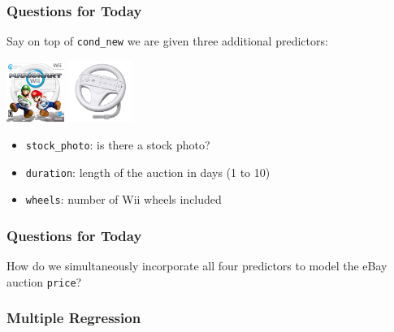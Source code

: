 \documentclass[handout]{beamer}
\newcommand{\blue}[1]{\textcolor{blue2}{#1}}
\begin{document}
\begin{frame}[fragile]
\frametitle{Questions for Today}


Say on top of {\tt cond\_new} we are given three additional predictors:
\pause\begin{center}
\includegraphics[height=2cm]{figure/mario_kart_action.png}
\includegraphics[height=2cm]{figure/wheel.png}
\end{center}

\begin{itemize}
\item {\tt stock\_photo}: is there a stock photo?
\item {\tt duration}: length of the auction in days (1 to 10)
\item {\tt wheels}: number of Wii wheels included
\end{itemize}


\end{frame}


\begin{frame}[fragile]
\frametitle{Questions for Today}

How do we simultaneously incorporate \blue{all} four predictors to model the eBay auction {\tt price}?

\end{frame}


\begin{frame}[fragile]
\frametitle{Multiple Regression}
%
%

\end{frame}
\end{document}
